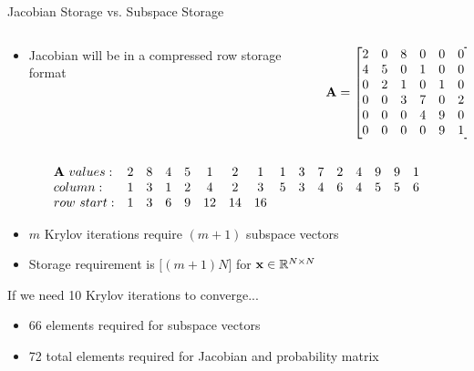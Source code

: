 \documentclass{beamer}
\begin{document}
\begin{frame}{Jacobian Storage vs. Subspace Storage}

  \begin{columns}

    \begin{column}{0.5\textwidth}
      \begin{itemize}
      \item Jacobian will be in a compressed row storage format
      \end{itemize}
    \end{column}

    \begin{column}{0.5\textwidth}
      \small{\[ \mathbf{A} =
        \begin{bmatrix}
          2 & 0 & 8 & 0 & 0 & 0 \\ 4 & 5 & 0 & 1 & 0 & 0 \\ 0 & 2 & 1
          & 0 & 1 & 0 \\ 0 & 0 & 3 & 7 & 0 & 2 \\ 0 & 0 & 0 & 4 & 9 &
          0 \\ 0 & 0 & 0 & 0 & 9 & 1 \\
        \end{bmatrix}      
        \]}
    \end{column}

  \end{columns}

  \small{ \[
    \begin{array}{lccccccccccccccc}
      \mathbf{A}\ values: & 2 & 8 & 4 & 5 & 1 & 2 & 1 & 1 & 3 & 7 & 2 & 4
      & 9 & 9 & 1 \\ column: & 1 & 3 & 1 & 2 & 4 & 2 & 3 & 5 & 3 & 4 &
      6 & 4 & 5 & 5 & 6 \\ row\ start: & 1 & 3 & 6 & 9 & 12 & 14 & 16
      \\
    \end{array}
    \]}

  \pause
  \begin{itemize}
  \item $m$ Krylov iterations require $(m+1)$ subspace vectors
  \item Storage requirement is $\big[(m+1) N\big]$ for $\mathbf{x} \in
    \mathbb{R}^{N \times N}$
  \end{itemize}

  \pause
  \begin{beamerboxesrounded}[upper=boxheadcolor,lower=boxbodycolor,shadow=true]
    {If we need 10 Krylov iterations to converge...}
    \begin{itemize}
    \item 66 elements required for subspace vectors
    \item 72 total elements required for Jacobian and probability
      matrix
    \end{itemize}
  \end{beamerboxesrounded}

\end{frame}
\end{document}
